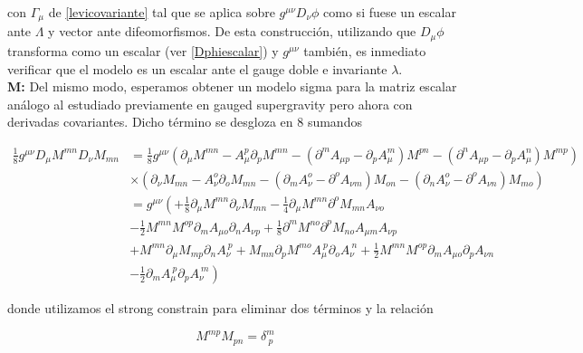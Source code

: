 \documentclass{article}
\numberwithin{equation}{section}
\begin{document}
con $ \Gamma_{\mu} $ de \ref{levicovariante} tal que se aplica sobre $ g^{\mu \nu}D_{\nu} \phi $ como si fuese un escalar ante $ \Lambda $ y vector ante difeomorfismos. De esta construcción, utilizando que $ D_{\mu} \phi $ transforma como un escalar (ver \ref{Dphiescalar}) y $ g^{\mu \nu} $ también, es inmediato verificar que el modelo es un escalar ante el gauge doble e invariante $ \lambda $.\\

\textbf{M:} Del mismo modo, esperamos obtener un modelo sigma para la matriz escalar análogo al estudiado previamente en gauged supergravity pero ahora con derivadas covariantes. Dicho término se desgloza en 8 sumandos

\begin{equation}\label{DMDM}
\begin{aligned}
\frac{1}{8} g^{\mu \nu} D_{\mu} M^{m n} D_{\nu} M_{m n}&= \frac{1}{8}g^{\mu \nu} (\partial_{\mu}{M^{m n}} - A_{\mu}^{p} \partial_{p}{M^{m n}} - (\partial^{m}{A_{\mu p}} - \partial_{p}{A_{\mu}^{m}}) M^{p n} - (\partial^{n}{A_{\mu p}} - \partial_{p}{A_{\mu}^{n}}) M^{m p})\\
& \times (\partial_{\nu}{M_{m n}} - A_{\nu}^{o} \partial_{o}{M_{m n}} - (\partial_{m}{A_{\nu}^{o}} - \partial^{o}{A_{\nu m}}) M_{o n} - (\partial_{n}{A_{\nu}^{o}} - \partial^{o}{A_{\nu n}}) M_{m o})\\
&= g^{\mu \nu} \left(+\frac{1}{8} \partial_{\mu}{M^{m n}} \partial_{\nu}{M_{m n}} - \frac{1}{4} \partial_{\mu}{M^{m n}} \partial^{o}{M_{m n}} A_{\nu o} \right.\\
&- \frac{1}{2} M^{m n} M^{o p} \partial_{m}{A_{\mu o}} \partial_{n}{A_{\nu p}}+\frac{1}{8} \partial^{m}{M^{n o}} \partial^{p}{M_{n o}} A_{\mu m} A_{\nu p}\\
& + M^{m n} \partial_{\mu}{M_{m p}} \partial_{n}{A_{\nu}^{\ p}}  + M_{m n} \partial_{p}{M^{m o}} A_{\mu}^{\ p} \partial_{o}{A_{\nu}^{\ n}} +\frac{1}{2}M^{m n} M^{o p} \partial_{m}{A_{\mu o}} \partial_{p}{A_{\nu n}}\\
& \left.  - \frac{1}{2} \partial_m A_{\mu}^{\ p} \partial_p A_{\nu}^{\ m} \right)
\end{aligned}
\end{equation}

donde utilizamos el strong constrain para eliminar dos términos y la relación 

\begin{equation}
M^{m p} M_{p n} = \delta^{m}_{\ p}
\end{equation}
\end{document}
